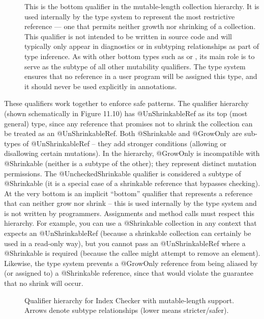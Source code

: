 \begin{description}
\item[]
  This is the bottom qualifier in the mutable-length collection hierarchy. It is used
  internally by the type system to represent the most restrictive reference — one that
  permits neither growth nor shrinking of a collection. This qualifier is not intended
  to be written in source code and will typically only appear in diagnostics or in
  subtyping relationships as part of type inference. As with other bottom types such as
   or
  , its main role is to serve as
  the subtype of all other mutability qualifiers. The type system ensures that no
  reference in a user program will be assigned this type, and it should never be used
  explicitly in annotations.
\end{description}

These qualifiers work together to enforce safe patterns. The qualifier hierarchy
(shown schematically in Figure 11.10) has @UnShrinkableRef as its top (most general) type,
since any reference that promises not to shrink the collection can be treated as an
@UnShrinkableRef. Both @Shrinkable and @GrowOnly are sub-types of @UnShrinkableRef –
they add stronger conditions (allowing or disallowing certain mutations). In the hierarchy,
@GrowOnly is incompatible with @Shrinkable (neither is a subtype of the other); they represent
distinct mutation permissions. The @UncheckedShrinkable qualifier is considered a subtype of
@Shrinkable (it is a special case of a shrinkable reference that bypasses checking). At the very
bottom is an implicit “bottom” qualifier that represents a reference that can neither grow nor
shrink – this is used internally by the type system and is not written by programmers.
Assignments and method calls must respect this hierarchy. For example, you can use a @Shrinkable
collection in any context that expects an @UnShrinkableRef (because a shrinkable collection can
certainly be used in a read-only way), but you cannot pass an @UnShrinkableRef where a @Shrinkable
is required (because the callee might attempt to remove an element). Likewise, the type system
prevents a @GrowOnly reference from being aliased by (or assigned to) a @Shrinkable reference,
since that would violate the guarantee that no shrink will occur.

\begin{figure}
\begin{center}
  \hfill
  \hfill
\end{center}
  \caption{Qualifier hierarchy for Index Checker with mutable-length support.
    Arrows denote subtype relationships (lower means stricter/safer).}
  \label{index-mutability-lattice}
\end{figure}

